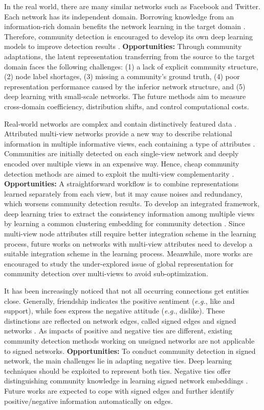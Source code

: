 In the real world, there are many similar networks such as Facebook and Twitter. Each network has its independent domain. Borrowing knowledge from an information-rich domain benefits the network learning in the target domain . Therefore, community detection is encouraged to develop its own deep learning models to improve detection results .
\vspace{2mm}
\noindent
\textbf{Opportunities:} Through community adaptations, the latent representation transferring from the source to the target domain faces the following challenges: (1) a lack of explicit community structure, (2) node label shortages, (3) missing a community's ground truth, (4) poor representation performance caused by the inferior network structure, and (5) deep learning with small-scale networks. The future methods aim to measure cross-domain coefficiency, distribution shifts, and control computational costs.

Real-world networks are complex and contain distinctively featured data . Attributed multi-view networks provide a new way to describe relational information in multiple informative views, each containing a type of attributes . Communities are initially detected on each single-view network and deeply encoded over multiple views in an expensive way. Hence, cheap community detection methods are aimed to exploit the multi-view complementarity .
\vspace{2mm}
\noindent
\textbf{Opportunities:} A straightforward workflow is to combine representations learned separately from each view, but it may cause noises and redundancy, which worsens community detection results. To develop an integrated framework, deep learning tries to extract the consistency information among multiple views by learning a common clustering embedding for community detection . Since multi-view node attributes still require better integration scheme in the learning process, future works on networks with multi-view attributes need to develop a suitable integration scheme in the learning process. Meanwhile, more works are encouraged to study the under-explored issue of global representation for community detection over multi-views to avoid sub-optimization.

It has been increasingly noticed that not all occurring connections get entities close. Generally, friendship indicates the positive sentiment (\textit{e.g.}, like and support), while foes express the negative attitude (\textit{e.g.}, dislike). These distinctions are reflected on network edges, called signed edges and signed networks . As impacts of positive and negative ties are different, existing community detection methods working on unsigned networks are not applicable to signed networks. 
\vspace{2mm}
\noindent
\textbf{Opportunities:} To conduct community detection in signed network, the main challenges lie in adapting negative ties. Deep learning techniques should be exploited to represent both ties. Negative ties offer distinguishing community knowledge in learning signed network embeddings . Future works are expected to cope with signed edges and further identify positive/negative information automatically on edges.

